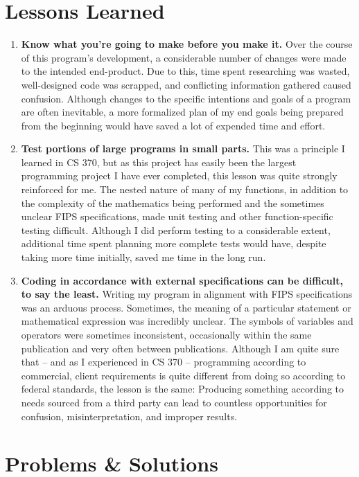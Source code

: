 \documentclass[11pt]{article}
\begin{document}
\section{Lessons Learned}

\begin{enumerate}
\item
{
\textbf{Know what you're going to make before you make it.} Over the course of this program's development, a considerable number of changes were made to the intended end-product. Due to this, time spent researching was wasted, well-designed code was scrapped, and conflicting information gathered caused confusion. Although changes to the specific intentions and goals of a program are often inevitable, a more formalized plan of my end goals being prepared from the beginning would have saved a lot of expended time and effort.
}
\item 
{
\textbf{Test portions of large programs in small parts.} This was a principle I learned in CS 370, but as this project has easily been the largest programming project I have ever completed, this lesson was quite strongly reinforced for me. The nested nature of many of my functions, in addition to the complexity of the mathematics being performed and the sometimes unclear FIPS specifications, made unit testing and other function-specific testing difficult. Although I did perform testing to a considerable extent, additional time spent planning more complete tests would have, despite taking more time initially, saved me time in the long run.
}
\item
{
\textbf{Coding in accordance with external specifications can be difficult, to say the least.} Writing my program in alignment with FIPS specifications was an arduous process. Sometimes, the meaning of a particular statement or mathematical expression was incredibly unclear. The symbols of variables and operators were sometimes inconsistent, occasionally within the same publication and very often between publications. Although I am quite sure that -- and as I experienced in CS 370 -- programming according to commercial, client requirements is quite different from doing so according to federal standards, the lesson is the same: Producing something according to needs sourced from a third party can lead to countless opportunities for confusion, misinterpretation, and improper results.
} 
\end{enumerate}

\section{Problems \& Solutions}
\end{document}

